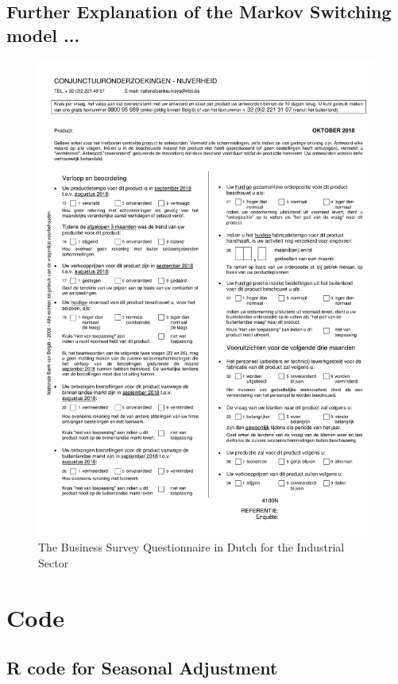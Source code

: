 \documentclass[12pt,a4paper,oneside]{book}
\begin{document}
\newpage
\section*{Further Explanation of the Markov Switching model ...}


\newpage
\begin{figure}[H]
    \centering
    \includegraphics[scale=0.75]{Images/IndustryN.pdf}
    \caption{The Business Survey Questionnaire in Dutch for the Industrial Sector}
    \label{B_pred}
\end{figure}





\chapter*{Code}
\section*{R code for Seasonal Adjustment}
\end{document}

